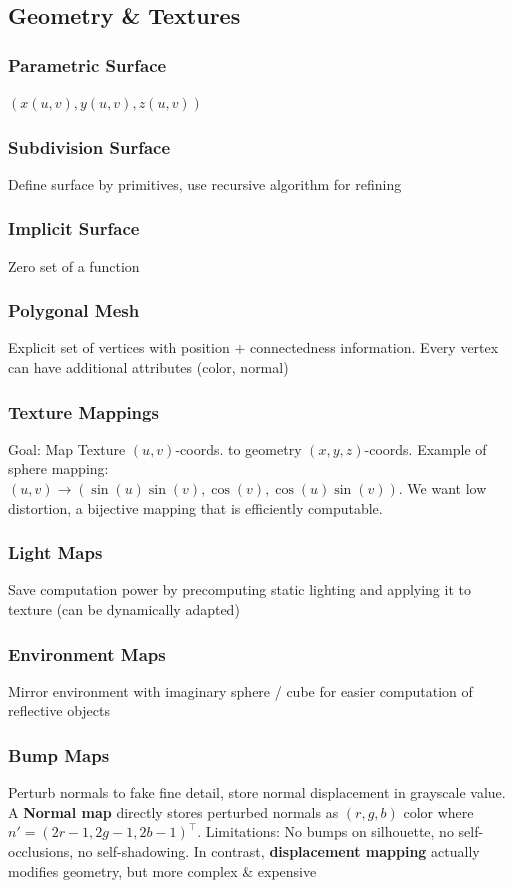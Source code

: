 \documentclass[a4paper,10pt]{article}
\begin{document}

\subsection{Geometry \& Textures}
\subsubsection{Parametric Surface} \( (x(u,v), y(u,v), z(u,v)) \)
\subsubsection{Subdivision Surface} Define surface by primitives, use recursive algorithm for refining
\subsubsection{Implicit Surface} Zero set of a function
\subsubsection{Polygonal Mesh} Explicit set of vertices with position + connectedness information. Every vertex can have additional attributes (color, normal)
\subsubsection{Texture Mappings} Goal: Map Texture \( (u,v) \)-coords. to geometry \( (x,y,z) \)-coords. Example of sphere mapping: \\\( (u,v) \to (\sin (u) \sin (v), \cos (v), \cos (u) \sin (v)) \). We want low distortion, a bijective mapping that is efficiently computable.
\subsubsection{Light Maps} Save computation power by precomputing static lighting and applying it to texture (can be dynamically adapted)
\subsubsection{Environment Maps} Mirror environment with imaginary sphere / cube for easier computation of reflective objects
\subsubsection{Bump Maps} Perturb normals to fake fine detail, store normal displacement in grayscale value. A \textbf{Normal map} directly stores perturbed normals as \( (r,g,b) \) color where \( n' = (2r - 1, 2g - 1, 2b -1)^\top \). Limitations: No bumps on silhouette, no self-occlusions, no self-shadowing. In contrast, \textbf{displacement mapping} actually modifies geometry, but more complex \& expensive
\end{document}
